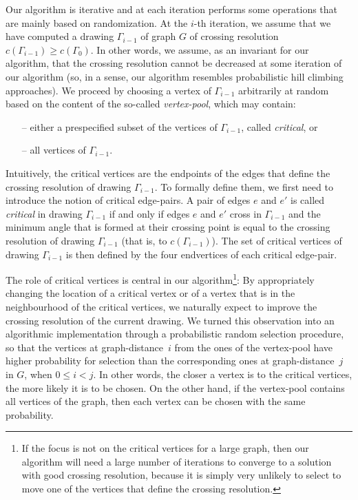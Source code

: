 \documentclass{comjnl}
\begin{document}
Our algorithm is iterative and at each iteration performs some operations that are mainly based on randomization. At the $i$-th iteration, we assume that we have computed a drawing $\Gamma_{i-1}$ of graph $G$ of crossing resolution $c(\Gamma_{i-1}) \geq c(\Gamma_0)$. In other words, we assume, as an invariant for our algorithm, that the crossing resolution cannot be decreased at some iteration of our algorithm (so, in a sense, our algorithm resembles probabilistic hill climbing approaches). We proceed by choosing a vertex of $\Gamma_{i-1}$ arbitrarily at random based on the content of the so-called \emph{vertex-pool}, which may contain:

\begin{itemize}
\item[--] either a prespecified subset of the vertices of $\Gamma_{i-1}$, called \emph{critical}, or
\item[--] all vertices of $\Gamma_{i-1}$.
\end{itemize}

Intuitively, the critical vertices are the endpoints of the edges that define the crossing resolution of drawing $\Gamma_{i-1}$. To formally define them, we first need to introduce the notion of critical edge-pairs. A pair of edges $e$ and $e'$ is called \emph{critical} in drawing $\Gamma_{i-1}$ if and only if edges $e$ and $e'$ cross in $\Gamma_{i-1}$ and the minimum angle that is formed at their crossing point is equal to the crossing resolution of drawing $\Gamma_{i-1}$ (that is, to $c(\Gamma_{i-1})$). The set of critical vertices of drawing $\Gamma_{i-1}$ is then defined by the four endvertices of each critical edge-pair.

The role of critical vertices is central in our algorithm\footnote{If the focus is not on the critical vertices for a large graph, then our algorithm will need a large number of iterations to converge to a solution with good crossing resolution, because it is simply very unlikely to select to move one of the vertices that define the crossing resolution.}: By appropriately changing the location of a critical vertex or of a vertex that is in the neighbourhood of the critical vertices, we naturally expect to improve the crossing resolution of the current drawing. We turned this observation into an algorithmic implementation through a probabilistic random selection procedure, so that the vertices at graph-distance~$i$ from the ones of the vertex-pool have higher probability for selection than the corresponding ones at graph-distance~$j$  in $G$, when $0 \leq i<j$. In other words, the closer a vertex is to the critical vertices, the more likely it is to be chosen. On the other hand, if the vertex-pool contains all vertices of the graph, then each vertex can be chosen with the same probability.
\end{document}
